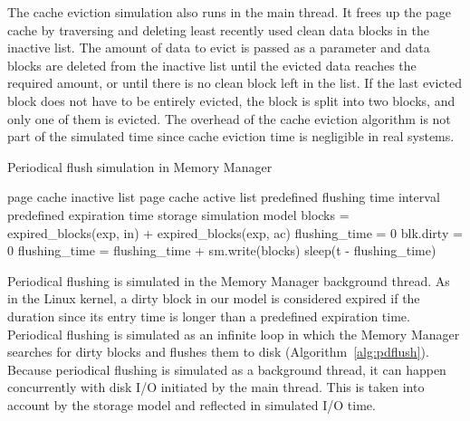 \documentclass[conference]{IEEEtran}
\newcommand{\Desc}[2]{\State \makebox[2em][l]{#1}#2}
\newcommand{\tristan}[1]{\color{orange}\textbf{From Tristan:}#1\color{black}}
\begin{document}
    The cache eviction simulation also runs in
    the main thread. It frees up the page cache by traversing and deleting
    least recently used clean data blocks in the inactive list.
    The amount of data to evict is passed as a parameter and data blocks are deleted
    from the inactive list until the evicted data reaches the required amount,
    or until there is no clean block left in the list.
    If the last evicted block does not have to be entirely evicted, the block is split into two blocks,
    and only one of them is evicted.
    The overhead of the cache eviction algorithm is not part of the simulated time
    since cache eviction time is negligible in real systems. %

    \begin{algorithm}[b]\caption{Periodical flush simulation in Memory Manager}\label{alg:pdflush}
        \small
        \begin{algorithmic}[1]
            \Input
                \Desc{in}{page cache inactive list}
                \Desc{ac}{page cache active list}
                \Desc{t}{predefined flushing time interval}
                \Desc{exp}{predefined expiration time}
                \Desc{sm}{storage simulation model}
               \EndInput
                \State blocks = expired\_blocks(exp, in) + expired\_blocks(exp, ac)
                \State flushing\_time = 0
                  \State blk.dirty = 0 
                  \State flushing\_time = flushing\_time + sm.write(blocks)
                \EndFor
                    \State sleep(t - flushing\_time)
                \EndIf  
            \EndWhile
        \end{algorithmic}
    \end{algorithm}

    Periodical flushing is simulated in the Memory Manager
    background thread. As in the Linux kernel, a dirty block
    in our model is considered expired if
    the duration since its entry time is longer than a
    predefined expiration time.
    Periodical flushing is simulated as an infinite loop in which
    the Memory Manager searches for dirty blocks and flushes them to disk (Algorithm~\ref{alg:pdflush}).
    Because periodical flushing is simulated as a background thread, it can happen concurrently
    with disk I/O initiated by the main thread. This is taken into account by the
    storage model and reflected in simulated I/O time.
\end{document}
